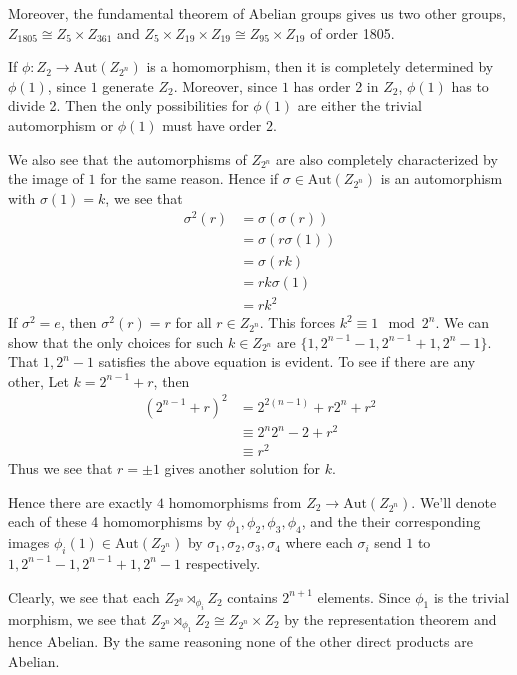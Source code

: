 \documentclass[12pt]{exam}
\theoremstyle{plain} %
\theoremstyle{definition} %
\theoremstyle{remark} %
\begin{document}
\begin{questions}
\begin{solution}
    Moreover, the fundamental theorem of Abelian groups gives us two
    other groups, $Z_{1805} \cong Z_5 \times Z_{361}$ and $Z_5 \times
    Z_{19} \times Z_{19} \cong Z_{95} \times Z_{19}$ of order 1805.
  \end{solution}

  \question
  \begin{solution}
    If $\phi: Z_2 \to \textrm{Aut}(Z_{2^n})$ is a homomorphism, then
    it is completely determined by $\phi(1)$, since $1$ generate
    $Z_2$. Moreover, since $1$ has order 2 in
    $Z_2$, $\phi(1)$ has to divide 2. Then the only
    possibilities for $\phi(1)$ are either the trivial automorphism
    or $\phi(1)$ must have order $2$.

    We also see that the automorphisms of $Z_{2^n}$ are also
    completely characterized by the image of $1$ for the same reason.
    Hence if $\sigma \in \textrm{Aut}(Z_{2^n})$ is an automorphism
    with $\sigma(1) = k$, we see that
    \begin{align*}
      \sigma^2(r) &= \sigma( \sigma(r)) \\
      &= \sigma( r \sigma(1)) \\
      &= \sigma( rk) \\
      &= rk \sigma(1) \\
      &= rk^2
    \end{align*}
    If $\sigma^2 = e$, then $\sigma^2(r) =
    r$ for all $r \in Z_{2^n}$. This forces $k^2 \equiv 1 \mod 2^n$.
    We can show that the only choices for such $k \in Z_{2^n}$ are
    $\{ 1, 2^{n-1}-1, 2^{n-1}+1, 2^n-1 \}$. That $1, 2^n - 1$
    satisfies the above equation is evident. To see if there are any
    other, Let $k = 2^{n-1} + r$, then
    \begin{align*}
      (2^{n-1} + r)^2 &= 2^{2(n-1)} + r2^n + r^2 \\
      &\equiv 2^n2^n-2 + r^2 \\
      &\equiv r^2
    \end{align*}
    Thus we see that $ r = \pm 1$  gives another solution for $k$.

    Hence there are exactly
    $4$ homomorphisms from $Z_2 \to \textrm{Aut}(Z_{2^n})$. We'll
    denote each of these 4 homomorphisms by
    $\phi_1, \phi_2, \phi_3, \phi_4$, and the their corresponding
    images $\phi_i(1) \in \textrm{Aut}(Z_{2^n})$ by $\sigma_1 ,
    \sigma_2 , \sigma_3, \sigma_4$ where each $\sigma_i$ send $1$ to
    $1, 2^{n-1} - 1, 2^{n-1} + 1, 2^{n} - 1$ respectively.

    Clearly,
    we see that each $Z_{2^n} \rtimes_{\phi_i} Z_{2}$ contains
    $2^{n+1}$ elements.
    Since $\phi_1$ is the trivial morphism, we see that $Z_{2^n}
    \rtimes_{\phi_1} Z_2 \cong Z_{2^n} \times Z_2$ by the
    representation theorem and hence Abelian. By the same reasoning none
    of the other direct products are Abelian.
  \end{solution}

\end{questions}
\printbibliography[heading=bibintoc]
\end{document}
